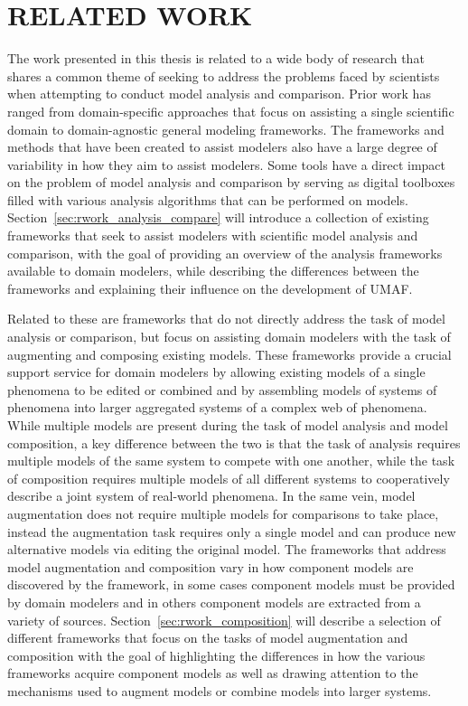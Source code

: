 \chapter{RELATED WORK\label{chapter:related_work}}
The work presented in this thesis is related to a wide body of research that shares a common theme of seeking to address the problems faced by scientists when attempting to conduct model analysis and comparison.
Prior work %
has ranged from domain-specific approaches that focus on assisting a single scientific domain to domain-agnostic general modeling frameworks.
The frameworks and methods that have been created to assist modelers also have a large degree of variability in how they aim to assist modelers.
Some tools have a direct impact on the problem of model analysis and comparison by serving as digital toolboxes filled with various analysis algorithms that can be performed on models.
Section~\ref{sec:rwork_analysis_compare} will introduce a collection of existing frameworks that seek to assist modelers with scientific model analysis and comparison, with the goal of providing an overview of the analysis frameworks available to domain modelers, while describing the differences between the frameworks and explaining their influence on the development of UMAF.

Related to these are frameworks that do not directly address the task of model analysis or comparison, but focus on assisting domain modelers with the task of augmenting and composing existing models.
These frameworks provide a crucial support service for domain modelers by allowing existing models of a single phenomena to be edited or combined and by assembling models of systems of phenomena into larger aggregated systems of a complex web of phenomena.
While multiple models are present during the task of model analysis and model composition, a key difference between the two is that the task of analysis requires multiple models of the same system to compete with one another, while the task of composition requires multiple models of all different systems to cooperatively describe a joint system of real-world phenomena.
In the same vein, model augmentation does not require multiple models for comparisons to take place, instead the augmentation task requires only a single model and can produce new alternative models via editing the original model.
The frameworks that address model augmentation and composition vary in how component models are discovered by the framework, in some cases component models must be provided by domain modelers and in others component models are extracted from a variety of sources.
Section~\ref{sec:rwork_composition} will describe a selection of different frameworks that focus on the tasks of model augmentation and composition with the goal of highlighting the differences in how the various frameworks acquire component models as well as drawing attention to the mechanisms used to augment models or combine models into larger systems.

